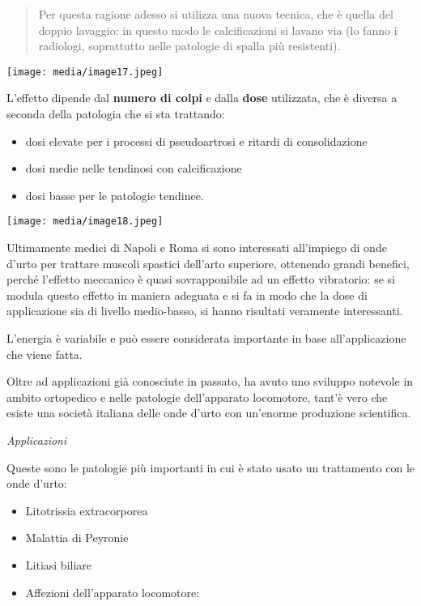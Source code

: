 \documentclass[]{article}
\begin{document}
\begin{quote}
Per questa ragione adesso si utilizza una nuova tecnica, che è quella
del doppio lavaggio: in questo modo le calcificazioni si lavano via (lo
fanno i radiologi, soprattutto nelle patologie di spalla più
resistenti).
\end{quote}

\texttt{[image: media/image17.jpeg]}

L'effetto dipende dal \textbf{numero di colpi} e dalla \textbf{dose}
utilizzata, che è diversa a seconda della patologia che si sta
trattando:

\begin{itemize}
\item
  dosi elevate per i processi di pseudoartrosi e ritardi di
  consolidazione
\item
  dosi medie nelle tendinosi con calcificazione
\item
  dosi basse per le patologie tendinee.
\end{itemize}

\texttt{[image: media/image18.jpeg]}

Ultimamente medici di Napoli e Roma si sono interessati all'impiego di
onde d'urto per trattare muscoli spastici dell'arto superiore, ottenendo
grandi benefici, perché l'effetto meccanico è quasi sovrapponibile ad un
effetto vibratorio: se si modula questo effetto in maniera adeguata e si
fa in modo che la dose di applicazione sia di livello medio-basso, si
hanno risultati veramente interessanti.

L'energia è variabile e può essere considerata importante in base
all'applicazione che viene fatta.

Oltre ad applicazioni già conosciute in passato, ha avuto uno sviluppo
notevole in ambito ortopedico e nelle patologie dell'apparato
locomotore, tant'è vero che esiste una società italiana delle onde
d'urto con un'enorme produzione scientifica.

\emph{Applicazioni}

Queste sono le patologie più importanti in cui è stato usato un
trattamento con le onde d'urto:

\begin{itemize}
\item
  Litotrissia extracorporea
\item
  Malattia di Peyronie
\item
  Litiasi biliare
\item
  Affezioni dell'apparato locomotore:
\end{itemize}
\end{document}
